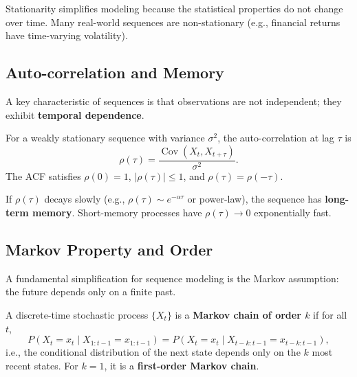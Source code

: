 \documentclass{tufte-handout}
\begin{document}
Stationarity simplifies modeling because the statistical properties do not change over time. Many real-world sequences are non-stationary (e.g., financial returns have time-varying volatility).

\subsection{Auto-correlation and Memory}

A key characteristic of sequences is that observations are not independent; they exhibit \textbf{temporal dependence}.

\begin{defn}
    For a weakly stationary sequence with variance $\sigma^2$, the auto-correlation at lag $\tau$ is
    \[
    \rho(\tau) = \frac{\operatorname{Cov}(X_t, X_{t+\tau})}{\sigma^2}.
    \]
    The ACF satisfies $\rho(0)=1$, $|\rho(\tau)|\le 1$, and $\rho(\tau)=\rho(-\tau)$.
\end{defn}

If $\rho(\tau)$ decays slowly (e.g., $\rho(\tau) \sim e^{-\alpha \tau}$ or power-law), the sequence has \textbf{long-term memory}. Short-memory processes have $\rho(\tau) \to 0$ exponentially fast.

\begin{marginfigure}
\centering
{}
\end{marginfigure}

\subsection{Markov Property and Order}

A fundamental simplification for sequence modeling is the Markov assumption: the future depends only on a finite past.

\begin{defn}
    A discrete-time stochastic process $\{X_t\}$ is a \textbf{Markov chain of order $k$} if for all $t$,
    \[
    P(X_t = x_t \mid X_{1:t-1} = x_{1:t-1}) = P(X_t = x_t \mid X_{t-k:t-1} = x_{t-k:t-1}),
    \]
    i.e., the conditional distribution of the next state depends only on the $k$ most recent states. For $k=1$, it is a \textbf{first-order Markov chain}.
\end{defn}
\end{document}
